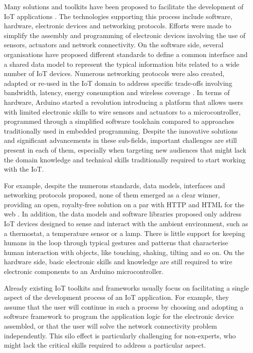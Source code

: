 Many solutions and toolkits have been proposed to facilitate the development of IoT applications \autocite{udoh_developing_2017}. The technologies supporting this process include software, hardware, electronic devices and networking protocols. Efforts were made to simplify the assembly and programming of electronic devices involving the use of sensors, actuators and network connectivity. On the software side, several organisations have proposed different standards to define a common interface and a shared data model to represent the typical information bits related to a wide number of IoT devices.
Numerous networking protocols were also created, adapted or re-used in the IoT domain to address specific trade-offs involving bandwidth, latency, energy consumption and wireless coverage \autocite{chen_performance_2016}. In terms of hardware, Arduino \autocite{mellis_arduino_2007} started a revolution introducing a platform that allows users with limited electronic skills to wire sensors and actuators to a microcontroller, programmed through a simplified software toolchain compared to approaches traditionally used in embedded programming.
Despite the innovative solutions and significant advancements in these sub-fields, important challenges are still present in each of them, especially when targeting new audiences that might lack the domain knowledge and technical skills traditionally required to start working with the IoT.

For example, despite the numerous standards, data models, interfaces and networking protocols proposed, none of them emerged as a clear winner, providing an open, royalty-free solution on a par with HTTP and HTML for the web \autocite{guinard_building_2016}. In addition, the data models and software libraries proposed only address IoT devices designed to sense and interact with the ambient environment, such as a thermostat, a temperature sensor or a lamp. There is little support for keeping humans in the loop through typical gestures and patterns that characterise human interaction with objects, like touching, shaking, tilting and so on.
On the hardware side, basic electronic skills and knowledge are still required to wire electronic components to an Arduino microcontroller.

Already existing IoT toolkits and frameworks usually focus on facilitating a single aspect of the development process of an IoT application. For example, they assume that the user will continue in such a process by choosing and adopting a software framework to program the application logic for the electronic device assembled, or that the user will solve the network connectivity problem independently. This silo effect is particularly challenging for non-experts, who might lack the critical skills required to address a particular aspect.

